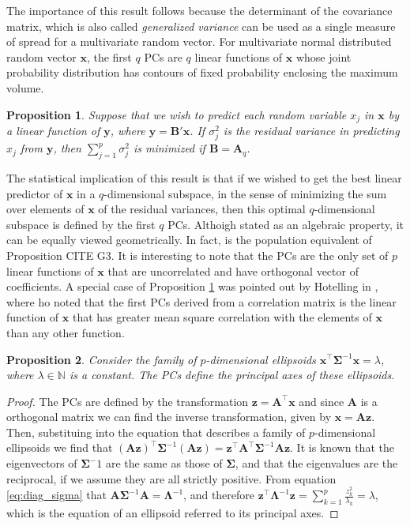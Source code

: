 \documentclass[11pt, oneside]{book}
\theoremstyle{plain}
\newtheorem{prop}{Proposition}[section]
\theoremstyle{remark}
\begin{document}
The importance of this result follows because the determinant of the covariance
matrix, which is also called \emph{generalized variance} can be used as a single
measure of spread for a multivariate random vector. For multivariate normal
distributed random vector $\mathbf{x}$, the first $q$ PCs are $q$ linear
functions of $\mathbf{x}$ whose joint probability distribution has contours of
fixed probability enclosing the maximum volume. 
\begin{prop}\label{prop:minimumvar}
    Suppose that we wish to predict each random variable $x_j$ in $\mathbf{x}$
    by a linear function of $\mathbf{y}$, where
    $\mathbf{y}=\mathbf{B}'\mathbf{x}$. If $\sigma_j^2$ is the residual variance
    in predicting $x_j$ from $\mathbf{y}$, then $\sum_{j=1}^p\sigma_j^2$ is
    minimized if $\mathbf{B} = \mathbf{A}_q$.
\end{prop}    
The statistical implication of this result is that if we wished to get the best
linear predictor of $\mathbf{x}$ in a $q$-dimensional subspace, in the sense of
minimizing the sum over elements of $\mathbf{x}$ of the residual variances, then
this optimal $q$-dimensional subspace is defined by the first $q$
PCs. Althoigh stated as an
algebraic property, it can be equally viewed geometrically. In fact, is the
population equivalent of Proposition CITE G3. It is interesting to note that the
PCs are the only set of $p$ linear functions of $\mathbf{x}$ that are
uncorrelated and have orthogonal vector of coefficients. A special case of
Proposition \ref{prop:minimumvar} was pointed out by Hotelling in
\cite{hotelling1933}, where ho noted that the first PCs derived from a
correlation matrix is the linear function of $\mathbf{x}$ that has greater mean
square correlation with the elements of $\mathbf{x}$ than any other function. 
\begin{prop}\label{prop:ellipsoids}
    Consider the family of $p$-dimensional ellipsoids
    $\mathbf{x}^\top\mathbf{\Sigma}^{-1}\mathbf{x} = \lambda$, where
    $\lambda\in\mathbb{N}$ is a constant. The PCs define the principal axes of
    these ellipsoids.
\end{prop}
\begin{proof}
    The PCs are defined by the transformation $\mathbf{z} =
    \mathbf{A}^\top\mathbf{x}$ and since $\mathbf{A}$ is a orthogonal matrix we
    can find the inverse transformation, given by $\mathbf{x} = \mathbf{Az}$.
    Then, substituing into the equation that describes a family of
    $p$-dimensional ellipsoids we find that
    $(\mathbf{Az})^\top\mathbf{\Sigma}^{-1}(\mathbf{Az}) = \mathbf{z}^\top
    \mathbf{A}^\top\mathbf{\Sigma}^{-1}\mathbf{Az}$. It is known that the
    eigenvectors of $\mathbf{\Sigma}^-1$ are the same as those of
    $\mathbf{\Sigma}$, and that the eigenvalues are the reciprocal, if we assume
    they are all strictly positive. From equation \eqref{eq:diag_sigma} that
    $\mathbf{A}\mathbf{\Sigma}^{-1}\mathbf{A} = \mathbf{\Lambda}^{-1}$, and
    therefore $\mathbf{z}^\top\mathbf{\Lambda}^{-1}\mathbf{z} =
    \sum_{k=1}^p\frac{z_k^2}{\lambda_k} = \lambda$, which is the equation of an
    ellipsoid referred to its principal axes. 
\end{proof}    
\end{document}
